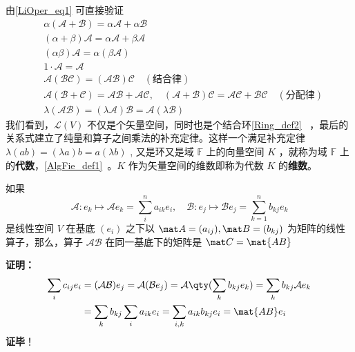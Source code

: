 由\autoref{LiOper_eq1} 可直接验证
\begin{equation}
\begin{aligned}
&\alpha(\mathcal{A+B})=\alpha\mathcal{A}+\alpha\mathcal{B}\\
&(\alpha+\beta)\mathcal{A}=\alpha\mathcal{A}+\beta\mathcal{A}\\
&(\alpha\beta)\mathcal{A}=\alpha(\beta\mathcal{A})\\
&1\cdot \mathcal{A}=\mathcal A\\
&\mathcal{A}(\mathcal{BC})=(\mathcal{AB})\mathcal C\quad(\text{结合律})\\
&\mathcal A(\mathcal{B+C})=\mathcal{AB+AC},\quad (\mathcal{A+B})\mathcal C=\mathcal{AC+BC}\quad(\text{分配律})\\
&\lambda(\mathcal{AB})=(\lambda\mathcal{A})\mathcal{B}=\mathcal{A}(\lambda \mathcal B)
\end{aligned}
\end{equation}
我们看到，$\mathcal{L}(V)$ 不仅是个矢量空间，同时也是个结合环\autoref{Ring_def2}~ ，最后的关系式建立了纯量和算子之间乘法的补充定律。这样一个满足补充定律 $\lambda(ab)=(\lambda a)b=a(\lambda b)$ , 又是环又是域 $\mathbb{F}$ 上的向量空间 $K$ ，就称为域 $\mathbb{F}$ 上的\textbf{代数}，\autoref{AlgFie_def1}~。$K$ 作为矢量空间的维数即称为代数 $K$ 的\textbf{维数}。

\begin{theorem}{}\label{LiOper_the1}
如果
\begin{equation}\label{LiOper_eq2}
\mathcal{A}: e_k\mapsto \mathcal{A} e_k=\sum_i^{n}a_{ik} e_i,\quad \mathcal{B}: e_j\mapsto  \mathcal{B} e_j=\sum_{k=1}^n b_{kj} e_k
\end{equation}
是线性空间 $V$ 在基底 $( e_i)$ 之下以 $\mat A=(a_{ij}), \mat B=(b_{kj})$ 为矩阵的线性算子，那么，算子 $\mathcal{AB}$ 在同一基底下的矩阵是 $\mat C=\mat{AB}$
\end{theorem}
\textbf{证明：}
\begin{equation}
\begin{aligned}
\sum_i c_{ij} e_i&=(\mathcal{AB}) e_j=\mathcal{A}(\mathcal{B} e_j)=\mathcal{A}\qty(\sum_k b_{kj} e_k)=\sum_k b_{kj}\mathcal{A} e_k\\
&=\sum_k b_{kj}\sum_i a_{ik} e_i=\sum_{i,k}a_{ik}b_{kj} e_i=\mat{AB} e_i
\end{aligned}
\end{equation}
\textbf{证毕}！
